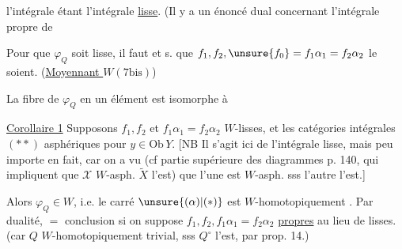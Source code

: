 l'intégrale étant l'intégrale \uline{lisse}. (Il y a un énoncé dual concernant l'intégrale propre de


 Pour que $\varphi_Q$ soit lisse, il faut et s. que $f_1,f_2,\unsure{f_0}=f_1\alpha_1=f_2\alpha_2$ le soient. (\uline{Moyennant $W(7\text{bis})$})



La fibre de $\varphi_Q$ en un  élément  est isomorphe à


\uline{Corollaire 1} Supposons $f_1,f_2$ et $f_1\alpha_1=f_2\alpha_2$ $W$-lisses, et les catégories intégrales $(**)$  asphériques pour  $y\in\mathrm{Ob}\,Y$. [NB Il s'agit ici de l'intégrale lisse, mais peu importe en fait, car on a vu  (cf   partie supérieure des diagrammes p. 140, qui impliquent que $\mathscr X$ $W$-asph.  $\widetilde X$ l'est) que l'une est $W$-asph. sss l'autre l'est.]


Alors $\varphi_Q\in W$, i.e. le carré $\unsure{(\alpha)|(*)}$ est $W$-homotopiquement . Par dualité, $=$ conclusion si on suppose $f_1,f_2,f_1\alpha_1=f_2\alpha_2$ \uline{propres} au lieu de lisses. (car $Q$ $W$-homotopiquement trivial, sss $Q^\circ$ l'est, par prop. 14.)
